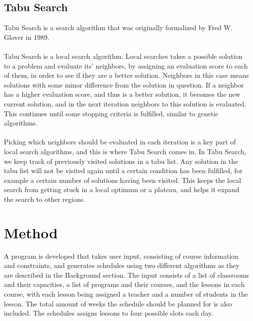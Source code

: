 \documentclass[titlepage,a4paper]{article}
\begin{document}
\subsection{Tabu Search}
Tabu Search is a search algorithm that was originally formalized by Fred W. Glover in 1989\cite{tabuSearch89}. \\\\
Tabu Search is a local search algorithm. Local searches takes a possible solution to a problem and evaluate its’ neighbors, by assigning an evaluation score to each of them, in order to see if they are a better solution. Neighbors in this case means solutions with some minor difference from the solution in question. If a neighbor has a higher evaluation score, and thus is a better solution, it becomes the new current solution, and in the next iteration neighbors to this solution is evaluated. This continues until some stopping criteria is fulfilled, similar to genetic algorithms. \\\\
Picking which neighbors should be evaluated in each iteration is a key part of local search algorithms, and this is where Tabu Search comes in.
In Tabu Search, we keep track of previously visited solutions in a tabu list. Any solution in the tabu list will not be visited again until a certain condition has been fulfilled, for example a certain number of solutions having been visited. This keeps the local search from getting stuck in a local optimum or a plateau, and helps it expand the search to other regions\cite{geneticVS99}. 

\pagebreak
\section{Method}
A program is developed that takes user input, consisting of course information and constraints, and generates schedules using two different algorithms as they are described in the Background section. The input consists of a list of classrooms and their capacities, a list of programs and their courses, and the lessons in each course, with each lesson being assigned a teacher and a number of students in the lesson. The total amount of weeks the schedule should be planned for is also included.
The schedules assigns lessons to four possible slots each day. \\\\
\end{document}
